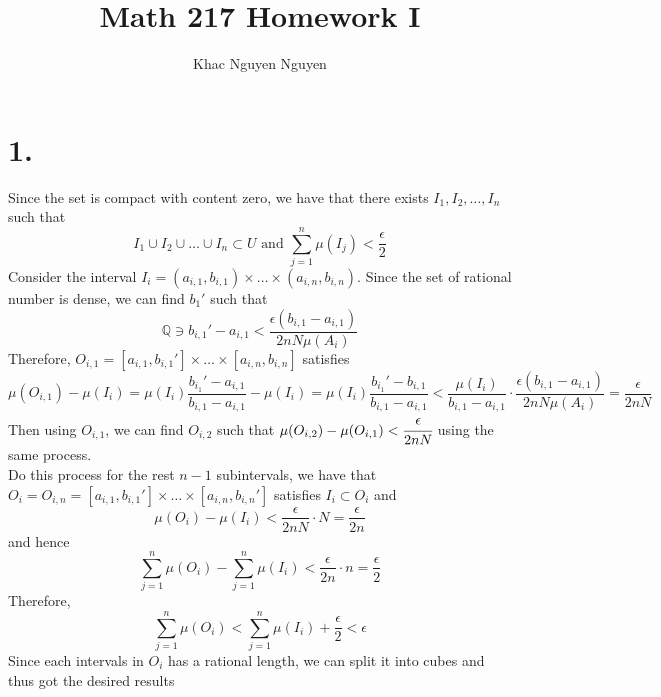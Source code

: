 \documentclass[11pt]{article}
\title{\textbf{Math 217 Homework I}}
\author{Khac Nguyen Nguyen}
\date{}
\begin{document}
\section*{1.}
Since the set is compact with content zero, we have that there exists $I_1, I_2, \ldots, I_n$ such that
\[
    I_1 \cup I_2 \cup \ldots \cup I_n \subset U \text{ and } \sum_{j=1}^n \mu(I_j) < \frac{\epsilon}{2} 
\]
Consider the interval $I_i = (a_{i,1}, b_{i,1}) \times \ldots \times (a_{i,n}, b_{i,n})$. 
Since the set of rational number is dense, we can find $b_1'$ such that 
\[
    \mathbb{Q} \ni b_{i,1}' - a_{i,1} < \frac{\epsilon (b_{i,1}- a_{i,1})}{2nN\mu(A_i)}
\]
Therefore, $O_{i,1} = [a_{i,1}, b_{i,1}'] \times \ldots \times [a_{i,n}, b_{i,n}]$ satisfies
\[
    \mu(O_{i,1}) - \mu(I_i) 
    = \mu(I_i) \frac{b_{i_1}' - a_{i,1}}{b_{i,1} - a_{i,1}} -\mu(I_i) 
    = \mu(I_i)\frac{b_{i_1}' - b_{i,1}}{b_{i,1} - a_{i,1}} 
    < \frac{\mu(I_i)}{b_{i,1} - a_{i,1}} \cdot \frac{\epsilon (b_{i,1}- a_{i,1})}{2nN\mu(A_i)} 
    = \frac{\epsilon}{2nN}
\]
Then using $O_{i,1}$, we can find $O_{i,2}$ such that $\mu(O_{i,2}) - \mu(O_{i,1}) < \cfrac{\epsilon}{2nN}$ using the same process. \\
Do this process for the rest $n-1$ subintervals, 
we have that $O_i = O_{i,n} = [a_{i,1}, b_{i,1}'] \times \ldots \times [a_{i,n}, b_{i,n}']$ satisfies $I_i \subset O_i$ and 
\[
    \mu(O_i) - \mu(I_i) < \frac{\epsilon}{2nN} \cdot N = \frac{\epsilon}{2n}
\]
and hence
\[
    \sum_{j=1}^n \mu(O_i) - \sum_{j=1}^n \mu(I_i) < \frac{\epsilon}{2n} \cdot n = \frac{\epsilon}{2}    
\]
Therefore, 
\[
    \sum_{j=1}^n \mu(O_i) < \sum_{j=1}^n \mu(I_i) + \frac{\epsilon}{2} < \epsilon    
\]
Since each intervals in $O_i$ has a rational length, we can split it into cubes and thus got the desired results
\end{document}
